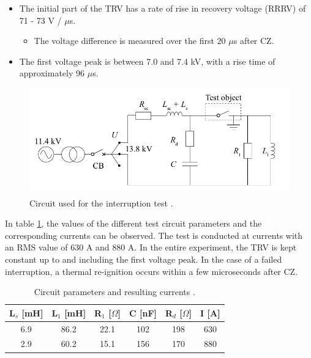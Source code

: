 \documentclass[10pt,b5paper,twoside]{article}
\begin{document}
\begin{itemize}
\item The initial part of the TRV has a rate of rise in recovery voltage (RRRV) of 71 - 73 V / $\mu$s.
	\begin{itemize}
		\item The voltage difference is measured over the first 20 $\mu$s after CZ.
	\end{itemize}
\item The first voltage peak is between 7.0 and 7.4 kV, with a rise time of approximately 96 $\mu$s.
\end{itemize}

\begin{figure} [H]
\centering
\includegraphics[scale=0.35]{Bilder/Method/circuit.png}
\caption{Circuit used for the interruption test \cite{bib:AFIMVLBA}.} \label{fig:testCurcuit}
\end{figure}

In table \ref{tab:testParameters}, the values of the different test circuit parameters and the corresponding currents can be observed. The test is conducted at currents with an RMS value of 630 A and 880 A. In the entire experiment, the TRV is kept constant up to and including the first voltage peak. In the case of a failed interruption, a thermal re-ignition occurs within a few microseconds after CZ.

\begin{table}[H]
\center
\caption{Circuit parameters and resulting currents \cite{bib:AFIMVLBA}. }
\begin{tabular}{|c|c|c|c|c|c|}
\hline 
L$_s$ [mH] & L$_1$ [mH] & R$_1$ [$\Omega$] & C [nF] & R$_{d}$ [$\Omega$] & I [A] \\ 
\hline 
6.9 & 86.2 & 22.1 & 102 & 198 & 630 \\ 
\hline
2.9 & 60.2 & 15.1 & 156 & 170 & 880 \\
\hline   
\end{tabular} 
\label{tab:testParameters}
\end{table}
\end{document}
